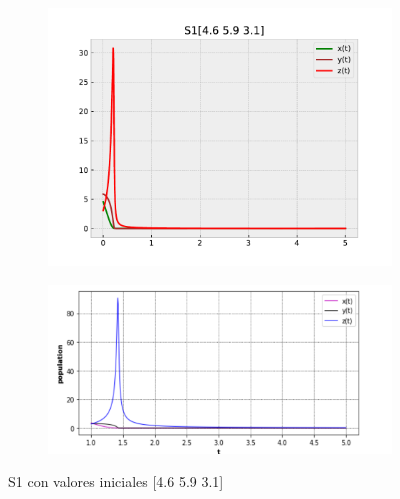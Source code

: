 \documentclass{wscpaperproc}
\theoremstyle{wsc}
\begin{document}
\begin{figure}[H]
	\centering
	\begin{subfigure}[b]{0.5\textwidth}
		\centering
		\includegraphics[width=\textwidth]{Simulations/S1[4.6 5.9 3.1].pdf}
	
		\label{fig:comparativa21}
	\end{subfigure}%
	\begin{subfigure}[b]{0.5\textwidth}
		\centering
		\includegraphics[width=\textwidth]{GraficasPaper/S1[2].png}
		\label{fig:comparativa22}
	\end{subfigure}
	\caption{S1 con valores iniciales [4.6 5.9 3.1]}

	\label{fig:comparacion2}
\end{figure}
\end{document}
